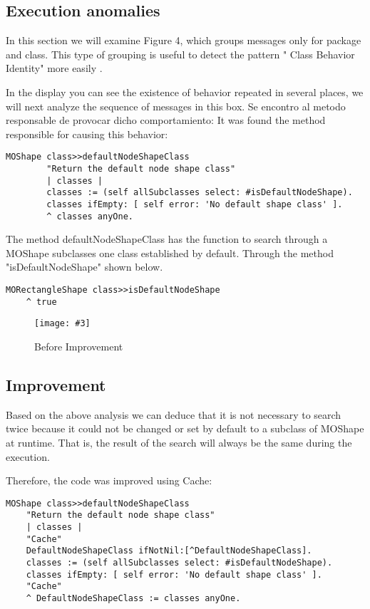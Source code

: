 \documentclass{sig-alternate}
\newcommand{\largefig}[4]{
	\begin{figure*}[#1]
		\centering
		\texttt{[image: \#3]}
		\caption{\label{fig:#3}#4}
	\end{figure*}}
\begin{document}
\subsection{Execution anomalies}

In this section we will examine Figure 4, which groups messages only for package and class. This type of grouping is useful to detect the pattern " Class Behavior Identity" more easily .

In the display you can see the existence of behavior repeated in several places, we  will next analyze the sequence of messages in this box.
Se encontro al metodo responsable de provocar dicho comportamiento:
It was found the method responsible for causing this behavior:

\begin{lstlisting}[language=Smalltalk]
MOShape class>>defaultNodeShapeClass
		"Return the default node shape class"
		| classes |
		classes := (self allSubclasses select: #isDefaultNodeShape).
		classes ifEmpty: [ self error: 'No default shape class' ].
		^ classes anyOne.
\end{lstlisting} 

The method defaultNodeShapeClass has the function to search through a MOShape subclasses one class established by default. Through the method "isDefaultNodeShape" shown below.

\begin{lstlisting}[language=Smalltalk]
MORectangleShape class>>isDefaultNodeShape
	^ true
\end{lstlisting} 

\largefig{}{1.0}{Mondrian1}{Before Improvement}
\subsection{Improvement}

Based on the above analysis we can deduce that it is not necessary to search twice because it could not be changed or set by default to a subclass of MOShape at runtime. That is, the result of the search will always be the same during the execution.

Therefore, the code was improved using Cache:

\begin{lstlisting}[language=Smalltalk]
MOShape class>>defaultNodeShapeClass
	"Return the default node shape class"
	| classes |
	"Cache"
	DefaultNodeShapeClass ifNotNil:[^DefaultNodeShapeClass].
	classes := (self allSubclasses select: #isDefaultNodeShape).
	classes ifEmpty: [ self error: 'No default shape class' ].
	"Cache"
	^ DefaultNodeShapeClass := classes anyOne.
\end{lstlisting} 
\end{document}
